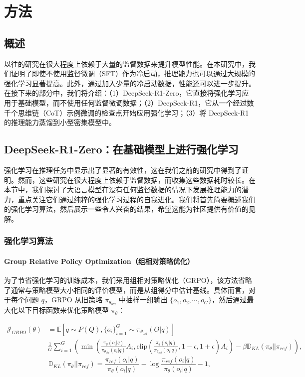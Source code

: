 \documentclass[lang=cn,a4paper,newtx]{elegantpaper}
\newcommand{\dsri}{DeepSeek-R1}
\newcommand{\dsro}{DeepSeek-R1-Zero}
\begin{document}
\section{方法}

\subsection{概述}

以往的研究在很大程度上依赖于大量的监督数据来提升模型性能。在本研究中，我们证明了即使不使用监督微调（SFT）作为冷启动，推理能力也可以通过大规模的强化学习显著提高。此外，通过加入少量的冷启动数据，性能还可以进一步提升。在接下来的部分中，我们将介绍：（1）\dsro{}，它直接将强化学习应用于基础模型，而不使用任何监督微调数据；（2）\dsri{}，它从一个经过数千个思维链（CoT）示例微调的检查点开始应用强化学习；（3）将 \dsri{} 的推理能力蒸馏到小型密集模型中。

\subsection{\dsro{}：在基础模型上进行强化学习}

强化学习在推理任务中显示出了显著的有效性，这在我们之前的研究中得到了证明。然而，这些研究在很大程度上依赖于监督数据，而收集这些数据耗时较长。在本节中，我们探讨了大语言模型在没有任何监督数据的情况下发展推理能力的潜力，重点关注它们通过纯粹的强化学习过程的自我进化。我们将首先简要概述我们的强化学习算法，然后展示一些令人兴奋的结果，希望这能为社区提供有价值的见解。

\subsubsection{强化学习算法}

\paragraph{Group Relative Policy Optimization（组相对策略优化）} 为了节省强化学习的训练成本，我们采用组相对策略优化（GRPO），该方法省略了通常与策略模型大小相同的评价模型，而是从组得分中估计基线。具体而言，对于每个问题 $q$，GRPO 从旧策略 $\pi_{\theta_{old}}$ 中抽样一组输出 $\{o_1, o_2, \cdots, o_G\}$，然后通过最大化以下目标函数来优化策略模型 $\pi_{\theta}$：

\begin{equation}
  \begin{split}
      \mathcal{J}_{GRPO}(\theta) &= \mathbb{E}{[q \sim P(Q), \{o_i\}_{i=1}^G \sim \pi_{\theta_{old}}(O|q)]}  \\
      & \frac{1}{G}\sum_{i=1}^G \left( \min \left( \frac{\pi_\theta(o_i |q)}{\pi_{\theta_{old}}(o_i |q)} A_i, \text{clip} \left( \frac{\pi_\theta(o_i |q)}{\pi_{\theta_{old}}(o_i |q)}, 1 - \epsilon, 1 + \epsilon \right)  A_i \right) - \beta \mathbb{D}_{KL}\left(\pi_{\theta} || \pi_{ref}\right)\right) ,
  \end{split}
  \label{eq:GRPO-obj}
\end{equation}
\begin{equation}
  \mathbb{D}_{KL}\left(\pi_{\theta} || \pi_{ref}\right) = \frac{\pi_{ref}(o_i|q)}{\pi_{\theta}(o_i|q)}- \log\frac{\pi_{ref}(o_i|q)}{\pi_{\theta}(o_i|q)} - 1,
\end{equation}
\end{document}
